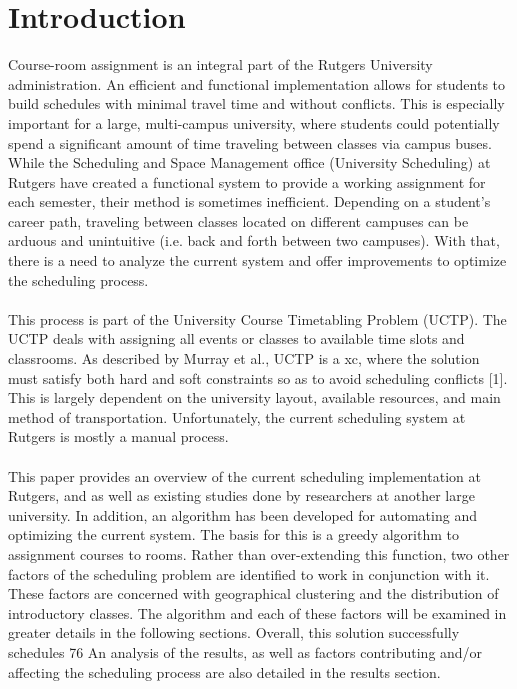 \documentclass[12pt]{article}
\begin{document}
\section{Introduction}
Course-room assignment is an integral part of the Rutgers University
administration. An efficient and functional implementation allows for students
to build schedules with minimal travel time and without conflicts. This is
especially important for a large, multi-campus university, where students could
potentially spend a significant amount of time traveling between classes via
campus buses. While the Scheduling and Space Management office (University
Scheduling) at Rutgers have created a functional system to provide a working
assignment for each semester, their method is sometimes inefficient. Depending
on a student’s career path, traveling between classes located on different
campuses can be arduous and unintuitive (i.e. back and forth between two
campuses). With that, there is a need to analyze the current system and offer
improvements to optimize the scheduling process. 
\\\\
This process is part of the University Course Timetabling Problem (UCTP). The
UCTP deals with assigning all events or classes to available time slots and
classrooms. As described by Murray et al., UCTP is a xc, where the solution
must satisfy both hard and soft constraints so as to avoid scheduling conflicts
[1]. This is largely dependent on the university layout, available resources,
and main method of transportation. Unfortunately, the current scheduling system
at Rutgers is mostly a manual process.
\\\\
This paper provides an overview of the current scheduling implementation at
Rutgers, and as well as existing studies done by researchers at another large
university. In addition, an algorithm has been developed for automating and
optimizing the current system. The basis for this is a greedy algorithm to
assignment courses to rooms. Rather than over-extending this function, two
other factors of the scheduling problem are identified to work in conjunction
with it. These factors are concerned with geographical clustering and the
distribution of introductory classes. The algorithm and each of these factors
will be examined in greater details in the following sections. Overall, this
solution successfully schedules 76%
An analysis of the results, as well as factors contributing and/or affecting
the scheduling process are also detailed in the results section. 
\end{document}
